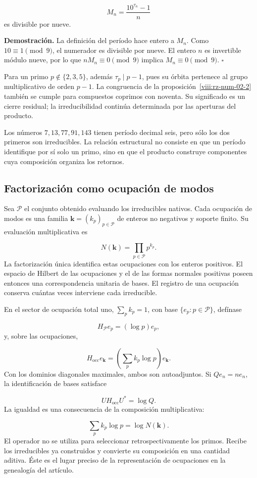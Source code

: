 \[
M_n=\frac{10^{\tau_n}-1}{n}
\]
es divisible por nueve.

\textbf{Demostración.} La definición del período hace entero a $M_n$. Como $10\equiv1\pmod9$, el numerador es divisible por nueve. El entero $n$ es invertible módulo nueve, por lo que $nM_n\equiv0\pmod9$ implica $M_n\equiv0\pmod9$. \hfill\(\square\)

Para un primo $p\notin\{2,3,5\}$, además $\tau_p\mid p-1$, pues su órbita pertenece al grupo multiplicativo de orden $p-1$. La congruencia de la proposición~\ref{viii:rz-num-02-2} también se cumple para compuestos coprimos con noventa. Su significado es un cierre residual; la irreducibilidad continúa determinada por las aperturas del producto.

Los números $7,13,77,91,143$ tienen período decimal seis, pero sólo los dos primeros son irreducibles. La relación estructural no consiste en que un período identifique por sí solo un primo, sino en que el producto construye componentes cuya composición organiza los retornos.

\subsection{Factorización como ocupación de modos}
Sea $\mathcal P$ el conjunto obtenido evaluando los irreducibles nativos. Cada ocupación de modos es una familia $\mathbf k=(k_p)_{p\in\mathcal P}$ de enteros no negativos y soporte finito. Su evaluación multiplicativa es

\[
N(\mathbf k)=\prod_{p\in\mathcal P}p^{k_p}.
\]
La factorización única identifica estas ocupaciones con los enteros positivos. El espacio de Hilbert de las ocupaciones y el de las formas normales positivas poseen entonces una correspondencia unitaria de bases. El registro de una ocupación conserva cuántas veces interviene cada irreducible.

En el sector de ocupación total uno, \(\sum_p k_p=1\), con base \(\{e_p:p\in\mathcal P\}\), defínase

\[
H_{\mathcal P}e_p=(\log p)e_p,
\]
y, sobre las ocupaciones,

\[
H_{\mathrm{occ}}e_{\mathbf k}
=\left(\sum_pk_p\log p\right)e_{\mathbf k}.
\]
Con los dominios diagonales maximales, ambos son autoadjuntos. Si $Qe_n=ne_n$, la identificación de bases satisface

\[
U H_{\mathrm{occ}}U^*=\log Q.
\]
La igualdad es una consecuencia de la composición multiplicativa:

\[
\sum_pk_p\log p=\log N(\mathbf k).
\]
El operador no se utiliza para seleccionar retrospectivamente los primos. Recibe los irreducibles ya construidos y convierte su composición en una cantidad aditiva. Éste es el lugar preciso de la representación de ocupaciones en la genealogía del artículo.

